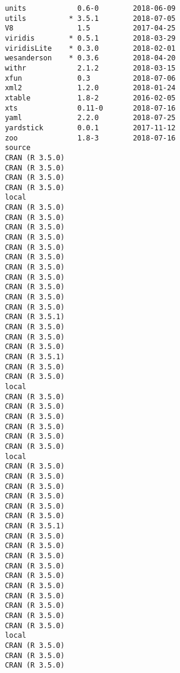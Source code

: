 \documentclass[twoside,12pt,final]{ucthesis-CA2012}
\begin{document}
\begin{ucmainmatter}
\begin{verbatim}
 units            0.6-0        2018-06-09
 utils          * 3.5.1        2018-07-05
 V8               1.5          2017-04-25
 viridis        * 0.5.1        2018-03-29
 viridisLite    * 0.3.0        2018-02-01
 wesanderson    * 0.3.6        2018-04-20
 withr            2.1.2        2018-03-15
 xfun             0.3          2018-07-06
 xml2             1.2.0        2018-01-24
 xtable           1.8-2        2016-02-05
 xts              0.11-0       2018-07-16
 yaml             2.2.0        2018-07-25
 yardstick        0.0.1        2017-11-12
 zoo              1.8-3        2018-07-16
 source                              
 CRAN (R 3.5.0)                      
 CRAN (R 3.5.0)                      
 CRAN (R 3.5.0)                      
 CRAN (R 3.5.0)                      
 local                               
 CRAN (R 3.5.0)                      
 CRAN (R 3.5.0)                      
 CRAN (R 3.5.0)                      
 CRAN (R 3.5.0)                      
 CRAN (R 3.5.0)                      
 CRAN (R 3.5.0)                      
 CRAN (R 3.5.0)                      
 CRAN (R 3.5.0)                      
 CRAN (R 3.5.0)                      
 CRAN (R 3.5.0)                      
 CRAN (R 3.5.0)                      
 CRAN (R 3.5.1)                      
 CRAN (R 3.5.0)                      
 CRAN (R 3.5.0)                      
 CRAN (R 3.5.0)                      
 CRAN (R 3.5.1)                      
 CRAN (R 3.5.0)                      
 CRAN (R 3.5.0)                      
 local                               
 CRAN (R 3.5.0)                      
 CRAN (R 3.5.0)                      
 CRAN (R 3.5.0)                      
 CRAN (R 3.5.0)                      
 CRAN (R 3.5.0)                      
 CRAN (R 3.5.0)                      
 local                               
 CRAN (R 3.5.0)                      
 CRAN (R 3.5.0)                      
 CRAN (R 3.5.0)                      
 CRAN (R 3.5.0)                      
 CRAN (R 3.5.0)                      
 CRAN (R 3.5.0)                      
 CRAN (R 3.5.1)                      
 CRAN (R 3.5.0)                      
 CRAN (R 3.5.0)                      
 CRAN (R 3.5.0)                      
 CRAN (R 3.5.0)                      
 CRAN (R 3.5.0)                      
 CRAN (R 3.5.0)                      
 CRAN (R 3.5.0)                      
 CRAN (R 3.5.0)                      
 CRAN (R 3.5.0)                      
 CRAN (R 3.5.0)                      
 local                               
 CRAN (R 3.5.0)                      
 CRAN (R 3.5.0)                      
 CRAN (R 3.5.0)                      

\end{verbatim}
\end{ucmainmatter}
\end{document}
